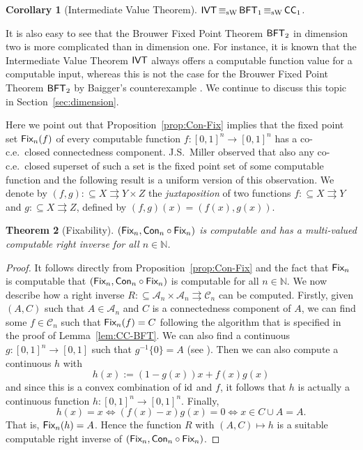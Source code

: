 \documentclass[a4paper]{amsart}
\def\AA{{\mathcal A}}
\def\CC{{\mathcal C}}
\def\IN{{\mathbb{N}}}
\def\In{\subseteq}
\def\mto{\rightrightarrows}
\def\id{{\rm id}}
\def\IVT{\text{\rm\sffamily IVT}}
\def\BFT{\mbox{\rm\sffamily BFT}}
\def\ConC{\mbox{\rm\sffamily CC}}
\def\Con{\text{\rm\sffamily Con}}
\def\Fix{\text{\rm\sffamily Fix}}
\def\equivSW{\mathop{\equiv_{\mathrm{sW}}}}
\newtheorem{theorem}{Theorem}[section]
\newtheorem{corollary}[theorem]{Corollary}
\theoremstyle{definition}
\begin{document}
\begin{corollary}[Intermediate Value Theorem]
\label{cor:IVT}
$\IVT\equivSW\BFT_1\equivSW\ConC_1$.
\end{corollary}

It is also easy to see that the Brouwer Fixed Point Theorem $\BFT_2$ in dimension two is 
more complicated than in dimension one. For instance, it is known that the Intermediate Value
Theorem $\IVT$ always offers a computable function value for a computable input, whereas
this is not the case for the Brouwer Fixed Point Theorem $\BFT_2$ by Baigger's counterexample
\cite{Bai85}. We continue to discuss this topic in Section~\ref{sec:dimension}.

Here we point out that Proposition~\ref{prop:Con-Fix} implies that the fixed point set $\Fix_n(f)$ 
of every computable function $f:[0,1]^n\to[0,1]^n$ has a co-c.e.\ closed connectedness component.
J.S.\ Miller observed that also any co-c.e.\ closed superset of such a set is the
fixed point set of some computable function and the following result is a uniform version
of this observation.
We denote by $(f,g):\In X\mto Y\times Z$ the {\em juxtaposition} of two functions $f:\In X\mto Y$
and $g:\In X\mto Z$, defined by $(f,g)(x)=(f(x),g(x))$.

\begin{theorem}[Fixability]
\label{thm:fixable}
$(\Fix_n,\Con_n\circ\Fix_n)$ is computable and has a multi-valued computable right inverse for all $n\in\IN$.
\end{theorem}
\begin{proof}
It follows directly from Proposition~\ref{prop:Con-Fix} and the fact that $\Fix_n$ is computable
that $(\Fix_n,\Con_n\circ\Fix_n)$ is computable for all $n\in\IN$.
We now describe how a right inverse $R:\In\AA_n\times\AA_n\mto\CC_n$ can be computed.
Firstly, given $(A,C)$ such that $A\in\AA_n$ and $C$ is a connectedness component of $A$,
we can find some $f\in\CC_n$ such that $\Fix_n(f)=C$ following the algorithm that is specified
in the proof of Lemma~\ref{lem:CC-BFT}. We can also find a continuous $g:[0,1]^n\to[0,1]$ such that
$g^{-1}\{0\}=A$ (see \cite{BW99}). Then we can also compute a continuous $h$ with
\[h(x):=(1-g(x))x+f(x)g(x)\]
and since this is a convex combination of $\id$ and $f$, it follows that $h$ is actually a continuous function $h:[0,1]^n\to[0,1]^n$. 
Finally, 
\[h(x)=x\iff(f(x)-x)g(x)=0\iff x\in C\cup A=A.\]
That is, $\Fix_n(h)=A$. Hence the function $R$ with $(A,C)\mapsto h$ is a suitable computable
right inverse of $(\Fix_n,\Con_n\circ\Fix_n)$.
\end{proof}
\end{document}
